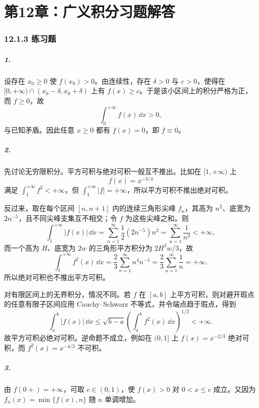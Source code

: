 
\chapter*{第12章：广义积分习题解答}
\subsection*{12.1.3 练习题}

\paragraph{1.}
设存在 $x_0\geq0$ 使 $f(x_0)>0$。由连续性，存在 $\delta>0$ 与 $c>0$，使得在
$[0,+\infty)\cap(x_0-\delta,x_0+\delta)$ 上有 $f(x)\geq c$。于是该小区间上的积分严格为正，而 $f\geq0$，故
\[
  \int_0^{+\infty}f(x)\,\dd x>0,
\]
与已知矛盾。因此任意 $x\geq0$ 都有 $f(x)=0$，即 $f\equiv0$。

\paragraph{2.}
先讨论无穷限积分。平方可积与绝对可积一般互不推出。比如在 $[1,+\infty)$ 上
\[
  f(x)=x^{-3/4}
\]
满足 $\int_1^{+\infty}f^2<+\infty$，但 $\int_1^{+\infty}|f|=+\infty$，所以平方可积不推出绝对可积。

反过来，取在每个区间 $[n,n+1]$ 内的连续三角形尖峰 $f_n$，其高为 $n^2$、底宽为 $2n^{-5}$，且不同尖峰支集互不相交；令 $f$ 为这些尖峰之和。则
\[
  \int_1^{+\infty}|f(x)|\,\dd x
  =\sum_{n=1}^{\infty}\frac12(2n^{-5})n^2
  =\sum_{n=1}^{\infty}\frac1{n^3}<+\infty,
\]
而一个高为 $H$、底宽为 $2w$ 的三角形平方积分为 $2H^2w/3$，故
\[
  \int_1^{+\infty}f^2(x)\,\dd x
  =\frac23\sum_{n=1}^{\infty}n^4n^{-5}
  =\frac23\sum_{n=1}^{\infty}\frac1n=+\infty.
\]
所以绝对可积也不推出平方可积。

对有限区间上的无界积分，情况不同。若 $f$ 在 $[a,b]$ 上平方可积，则对避开瑕点的任意有限子区间应用 Cauchy--Schwarz 不等式，并令端点趋于瑕点，得到
\[
  \int_a^b|f(x)|\,\dd x
  \leq \sqrt{b-a}\left(\int_a^b f^2(x)\,\dd x\right)^{1/2}<+\infty.
\]
故平方可积必绝对可积。逆命题不成立，例如在 $(0,1]$ 上 $f(x)=x^{-2/3}$ 绝对可积，而 $f^2(x)=x^{-4/3}$ 不可积。

\paragraph{3.}
由 $f(0+)=+\infty$，可取 $c\in(0,1)$，使 $f(x)>0$ 对 $0<x\leq c$ 成立。又因为 $f_n(x)=\min\{f(x),n\}$ 随 $n$ 单调增加。

